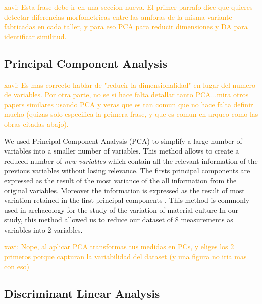 \documentclass[review]{elsarticle}
\newcommand{\memo}[2]{\textcolor{#1}{#2}}
\newcommand{\xavi}[1]{\memo{orange}{xavi: #1\\}}
\begin{document}
\xavi{Esta frase debe ir en una seccion nueva. El primer parrafo dice que quieres detectar diferencias morfometricas entre las amforas de la misma variante fabricadas en cada taller, y para eso PCA para reducir dimensiones y DA para identificar similitud.}

\subsection{Principal Component Analysis}

\xavi{Es mas correcto hablar de "reducir la dimensionalidad" en lugar del numero de variables. Por otra parte, no se si hace falta detallar tanto PCA...mira otros papers similares usando PCA y veras que es tan comun que no hace falta definir mucho (quizas solo especifica la primera frase, y que es comun en arqueo como las obras citadas abajo).}

We used Principal Component Analysis (PCA) to simplify a large number of variables into a smaller number of variables. This method allows to create a reduced number of \textit{new variables} which contain all the relevant information of the previous variables without losing relevance. The firsts principal components are expressed as the result of the most variance of the all information from the original variables. Moreover the information is expressed as the result of most variation retained in the first principal components \citep{jolliffe_principal_2002, shennan_quantifying_1997}. 
This method is commonly used in archaeology for the study of the variation of material culture \citep{li_crossbows_2014, schillinger_differences_2016} 
In our study, this method allowed us to reduce our dataset of 8 measurements as variables into 2 variables. 

\xavi{Nope, al aplicar PCA transformas tus medidas en PCs, y eliges los 2 primeros porque capturan la variabilidad del dataset (y una figura no iria mas con eso)}

\subsection{Discriminant Linear Analysis} 
\end{document}
